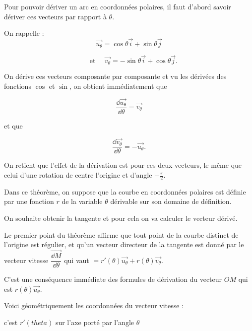 \diapo

Pour pouvoir dériver un arc en coordonnées polaires, 
il faut d'abord savoir 
dériver ces vecteurs par rapport à $\theta$.

On rappelle :
$$\overrightarrow{u_\theta}=\cos\theta\overrightarrow{i}+\sin\theta\overrightarrow{j}
$$

\change
$$\quad \text{ et  }\quad 
\overrightarrow{v_\theta}=-\sin\theta\overrightarrow{i}+\cos\theta\overrightarrow{j}
.$$ 



\change

On dérive ces vecteurs composante par composante et 
vu les dérivées des fonctions $\cos$ et $\sin$, on obtient immédiatement que 

$$\frac{\dd\overrightarrow{u_\theta}}{\dd\theta}
=\overrightarrow{v_\theta}$$

et que 


$$\frac{\dd\overrightarrow{v_\theta}}{\dd\theta}=-\overrightarrow{u_\theta}.$$

\change

On retient que l'effet de la dérivation est pour ces deux vecteurs, 
le même que celui d'une rotation de centre l'origine et d'angle $+\frac{\pi}{2}$.






\diapo


Dans ce théorème, on suppose que la courbe en coordonnées polaires 
est définie par une fonction $r$ de la variable $\theta$ 
dérivable sur son domaine de définition.

\change
On souhaite obtenir la tangente et pour cela on va calculer le vecteur dérivé.

\change
Le premier point du théorème affirme que tout point de la 
courbe distinct de l'origine est régulier, et qu'un vecteur directeur de la tangente est donné par 
le vecteur vitesse 
$\overrightarrow{\dfrac{\dd M}{\dd \theta}}$
qui vaut $=r'(\theta)\overrightarrow{u_\theta}+r(\theta)\overrightarrow{v_\theta}$.

C'est une conséquence immédiate des formules de dérivation
du vecteur $OM$ qui est $r(\theta) \overrightarrow{u_\theta}$.

\change
Voici géométriquement les coordonnées du vecteur vitesse : 

c'est $r'(theta)$ sur l'axe porté par l'angle $\theta$

